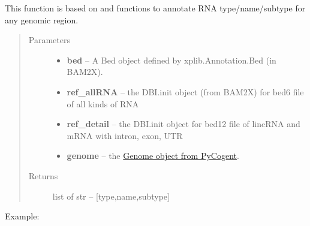 \documentclass[letterpaper,10pt,english]{sphinxmanual}
\begin{document}

\begin{fulllineitems}
\label{Other_api:Annotation.annotation}
This function is based on {\hyperref[Other_api:Annotation.overlap]{}} and {\hyperref[Other_api:Annotation.Subtype]{}} functions to annotate RNA type/name/subtype for any genomic region.
\begin{quote}\begin{description}
\item[{Parameters}] \leavevmode\begin{itemize}
\item {} 
\textbf{bed} -- A Bed object defined by xplib.Annotation.Bed (in BAM2X).

\item {} 
\textbf{ref\_allRNA} -- the DBI.init object (from BAM2X) for bed6 file of all kinds of RNA

\item {} 
\textbf{ref\_detail} -- the DBI.init object for bed12 file of lincRNA and mRNA with intron, exon, UTR

\item {} 
\textbf{genome} -- the \href{http://pycogent.org/cookbook/accessing\_databases.html\#get-genomic-features}{Genome object from PyCogent}.

\end{itemize}

\item[{Returns}] \leavevmode
list of str -- {[}type,name,subtype{]}

\end{description}\end{quote}

Example:


\end{fulllineitems}
\end{document}
